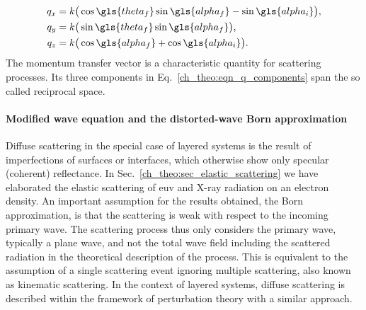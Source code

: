 \begin{align}\begin{split}
q_x &= k \big( \cos \gls{theta_f} \sin \gls{alpha_f} - \sin \gls{alpha_i}\big)\text{,}\\
q_y &= k \big( \sin \gls{theta_f} \sin \gls{alpha_f}\big)\text{,}\\
q_z &= k \big( \cos \gls{alpha_f} + \cos \gls{alpha_i}\big)\text{.}
\end{split} \label{ch_theo:eqn_q_components}
\end{align}
The momentum transfer vector is a characteristic quantity for scattering processes. Its three components in Eq.~\eqref{ch_theo:eqn_q_components} span the so called reciprocal space.

\paragraph{Modified wave equation and the distorted-wave Born approximation}
Diffuse scattering in the special case of layered systems is the result of imperfections of surfaces or interfaces, which otherwise show only specular (coherent) reflectance. In Sec.~\ref{ch_theo:sec_elastic_scattering} we have elaborated the elastic scattering of \gls{euv} and X-ray radiation on an electron density. An important assumption for the results obtained, the Born approximation, is that the scattering is weak with respect to the incoming primary wave. The scattering process thus only considers the primary wave, typically a plane wave, and not the total wave field including the scattered radiation in the theoretical description of the process. This is equivalent to the assumption of a single scattering event ignoring multiple scattering, also known as kinematic scattering. In the context of layered systems, diffuse scattering is described within the framework of perturbation theory with a similar approach.

